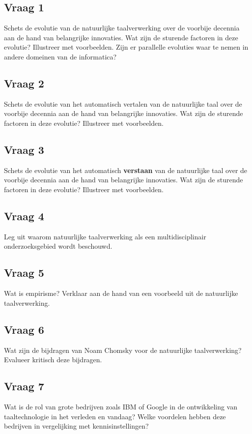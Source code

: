 \documentclass[../main.tex]{subfiles}
\begin{document}
\subsection{Vraag 1}
\begin{question}
Schets de evolutie van de natuurlijke taalverwerking over de voorbije decennia aan de hand van belangrijke innovaties. Wat zijn de sturende factoren in deze evolutie? Illustreer met voorbeelden.
Zijn er parallelle evoluties waar te nemen in andere domeinen van de informatica?
\end{question}

\subsection{Vraag 2}
\begin{question}
Schets de evolutie van het automatisch vertalen van de natuurlijke taal over de voorbije decennia aan de hand van belangrijke innovaties. Wat zijn de sturende factoren in deze evolutie? Illustreer met voorbeelden.
\end{question}

\subsection{Vraag 3}
\begin{question}
Schets de evolutie van het automatisch \textbf{verstaan} van de natuurlijke taal over de voorbije decennia aan de hand van belangrijke innovaties. Wat zijn de sturende factoren in deze evolutie? Illustreer met voorbeelden.
\end{question}

\subsection{Vraag 4}
\begin{question}
Leg uit waarom natuurlijke taalverwerking als een multidisciplinair onderzoeksgebied wordt beschouwd.
\end{question}

\subsection{Vraag 5}
\begin{question}
Wat is empirisme? Verklaar aan de hand van een voorbeeld uit de natuurlijke taalverwerking.
\end{question}

\subsection{Vraag 6}
\begin{question}
Wat zijn de bijdragen van Noam Chomsky voor de natuurlijke taalverwerking? Evalueer kritisch deze bijdragen.
\end{question}

\subsection{Vraag 7}
\begin{question}
Wat is de rol van grote bedrijven zoals IBM of Google in de ontwikkeling van taaltechnologie in het verleden en vandaag? Welke voordelen hebben deze bedrijven in vergelijking met kennisinstellingen?
\end{question}
\end{document}
